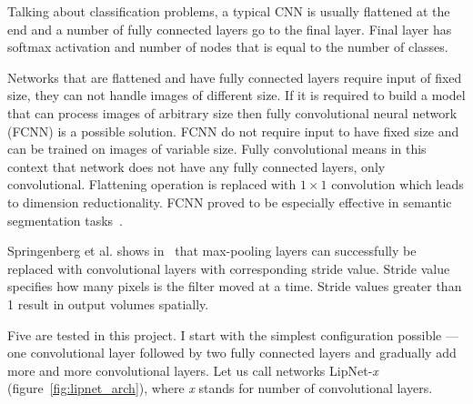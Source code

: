 \documentclass[a4paper, 11pt, table]{article}
\begin{document}
Talking about classification problems, a typical CNN is usually flattened at the end and a number of fully connected layers go to the final layer. Final layer has softmax activation and number of nodes that is equal to the number of classes. 

Networks that are flattened and have fully connected layers require input of fixed size, they can not handle images of different size. If it is required to build a model that can process images of arbitrary size then fully convolutional neural network (FCNN) is a possible solution. FCNN do not require input to have fixed size and can be trained on images of variable size. Fully convolutional means in this context that network does not have any fully connected layers, only convolutional. Flattening operation is replaced with $1 \times 1$ convolution which leads to dimension reductionality. FCNN proved to be especially effective in semantic segmentation tasks~\cite{DBLP:journals/corr/ShelhamerLD16}.

Springenberg et al. shows in~\cite{DBLP:journals/corr/SpringenbergDBR14} that max-pooling layers can successfully be replaced with convolutional layers with corresponding stride value. Stride value specifies how many pixels is the filter moved at a time. Stride values greater than 1 result in output volumes spatially. 

Five are tested in this project. I start with the simplest configuration possible --- one convolutional layer followed by two fully connected layers and gradually add more and more convolutional layers. Let us call networks LipNet-\textit{x} (figure~\ref{fig:lipnet_arch}), where \textit{x} stands for number of convolutional layers. 
\end{document}
